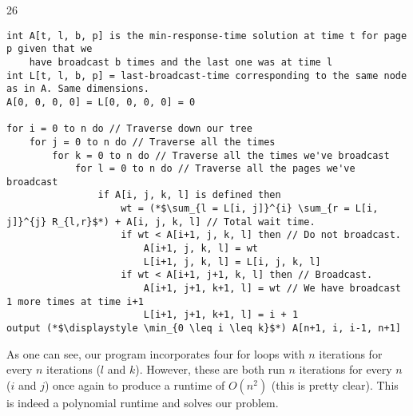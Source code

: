 \documentclass{article}
\begin{document}
\begin{prob} {26}
	\pagebreak
	\begin{lstlisting}
int A[t, l, b, p] is the min-response-time solution at time t for page p given that we
    have broadcast b times and the last one was at time l
int L[t, l, b, p] = last-broadcast-time corresponding to the same node as in A. Same dimensions.
A[0, 0, 0, 0] = L[0, 0, 0, 0] = 0

for i = 0 to n do // Traverse down our tree
    for j = 0 to n do // Traverse all the times
        for k = 0 to n do // Traverse all the times we've broadcast
            for l = 0 to n do // Traverse all the pages we've broadcast
                if A[i, j, k, l] is defined then
                    wt = (*$\sum_{l = L[i, j]}^{i} \sum_{r = L[i, j]}^{j} R_{l,r}$*) + A[i, j, k, l] // Total wait time.
                    if wt < A[i+1, j, k, l] then // Do not broadcast.
                        A[i+1, j, k, l] = wt
                        L[i+1, j, k, l] = L[i, j, k, l]
                    if wt < A[i+1, j+1, k, l] then // Broadcast.
                        A[i+1, j+1, k+1, l] = wt // We have broadcast 1 more times at time i+1
                        L[i+1, j+1, k+1, l] = i + 1
output (*$\displaystyle \min_{0 \leq i \leq k}$*) A[n+1, i, i-1, n+1]
	\end{lstlisting}
	
	As one can see, our program incorporates four for loops with $n$ iterations for every $n$ iterations ($l$ and $k$).  However, these are both run $n$ iterations for every $n$ ($i$ and $j$) once again to produce a runtime of $O(n^2)$ (this is pretty clear).  This is indeed a polynomial runtime and solves our problem.
\end{prob}
\end{document}

